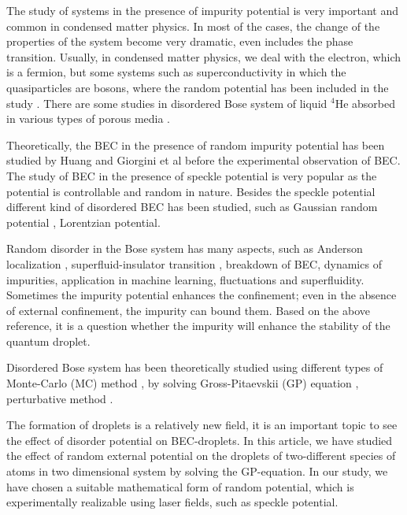 \documentclass[amsmath,amssymb,lengthcheck,aps,prl] {revtex4}
\begin{document}
	 The study of systems in the presence of impurity potential is very important and common in condensed matter physics. In most of the cases, the change of the properties of the system become very dramatic, even includes the phase transition. Usually,  in condensed matter physics, we deal with the electron, which is a fermion, but some systems such as superconductivity in which the quasiparticles are bosons, where the random potential has been included in the study \cite{Trivedi1991}. There are some studies in disordered Bose system of liquid $^4$He absorbed in various types of porous media \cite{He4porous}. 

	 Theoretically, the BEC in the presence of random impurity potential has been studied by Huang \cite{Huang1992} and Giorgini et al \cite{Stringari1994} before the experimental observation of BEC. 
	 The study of BEC in the presence of speckle potential \cite{speckle1, speckle2, speckle3, speckle4,speckle5, machin_learning} is very popular as the potential is controllable and random in nature. Besides the speckle potential different kind of disordered BEC has been studied, such as Gaussian random potential \cite{Gaussian1, Gaussian_Adhikari, GP_random2, Gaussian2014,Gaussian2018}, Lorentzian potential\cite{Lorentzian}.

Random disorder in the Bose system has many aspects, such as Anderson localization \cite{Anderson2007, Anderson2010, Anderson2008, Anderson2021}, superfluid-insulator transition  \cite{SIT3_2004, SIT1_2014, SIT2_2013}, breakdown of BEC, dynamics of impurities\cite{dynamics_imp1}, application in machine learning\cite{machin_learning}, fluctuations and superfluidity\cite{BBM-2020}. 
	 Sometimes the impurity potential enhances the confinement; even in the absence of external confinement, the impurity can bound them\cite{boundImp1}. 
	 Based on the above reference, it is a question whether the impurity will enhance the stability of the quantum droplet.

	 Disordered Bose system has been theoretically studied using different types of Monte-Carlo (MC) method \cite{PIM_2010_Pilati,diff_mc,quantum_mc}, by solving Gross-Pitaevskii (GP) equation \cite{GP_random1, GP_random2, GP_random3}, perturbative method \cite{analytical_ran1, MFT1}. 

The formation of droplets is a relatively new field, it is an important topic to see the effect of disorder potential on BEC-droplets. In this article, we have studied the effect of random external potential on the droplets of two-different species of atoms in two dimensional system by solving the GP-equation. In our study, we have chosen a suitable mathematical form of random potential, which is experimentally realizable using laser fields, such as speckle potential.
\end{document}
